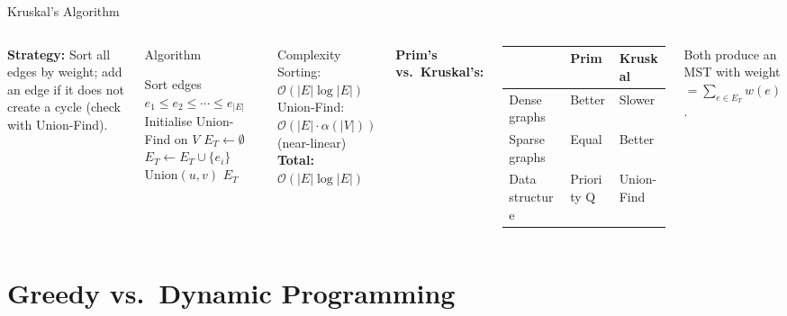 \documentclass[aspectratio=169]{beamer}
\begin{document}
\begin{frame}[shrink=12]{Kruskal's Algorithm}
  \begin{columns}[T]
      \textbf{Strategy:} Sort all edges by weight; add an edge if it
      does not create a cycle (check with Union-Find).

      \vspace{0.3em}
      \begin{block}{Algorithm}
        \begin{algorithmic}[1]
          \State Sort edges $e_1\leq e_2\leq\cdots\leq e_{|E|}$
          \State Initialise Union-Find on $V$
          \State $E_T \gets \emptyset$
              \State $E_T \gets E_T \cup \{e_i\}$
              \State $\text{Union}(u, v)$
            \EndIf
          \EndFor
          \State \Return $E_T$
        \end{algorithmic}
      \end{block}
      \begin{alertblock}{Complexity}
        Sorting: $\mathcal{O}(|E|\log|E|)$\\
        Union-Find: $\mathcal{O}(|E|\cdot\alpha(|V|))$ (near-linear)\\
        \textbf{Total:} $\mathcal{O}(|E|\log|E|)$
      \end{alertblock}
      \vspace{0.3em}
      \textbf{Prim's vs.\ Kruskal's:}
      \begin{tabular}{lll}
        & Prim & Kruskal \\
        \midrule
        Dense graphs & Better & Slower \\
        Sparse graphs & Equal & Better \\
        Data structure & Priority Q & Union-Find \\
      \end{tabular}
      \vspace{0.2em}
      Both produce an MST with weight $= \sum_{e\in E_T} w(e)$.
  \end{columns}
\end{frame}

\section{Greedy vs.\ Dynamic Programming}
\end{document}
